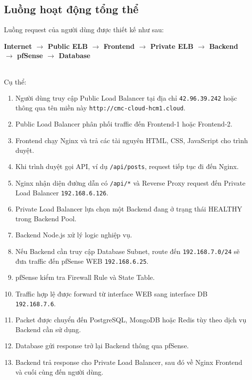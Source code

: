\documentclass[12pt, a4paper]{article}
\begin{document}
\subsection{Luồng hoạt động tổng thể}

Luồng request của người dùng được thiết kế như sau: \\

\begin{center}
\textbf{
Internet
$\rightarrow$
Public ELB
$\rightarrow$
Frontend
$\rightarrow$
Private ELB
$\rightarrow$
Backend
$\rightarrow$
pfSense
$\rightarrow$
Database
} 
\end{center} \\


\noindent Cụ thể:

\begin{enumerate}
    \item Người dùng truy cập Public Load Balancer tại địa chỉ
    \texttt{42.96.39.242} hoặc thông qua tên miền này \texttt{http://cmc-cloud-hcm1.cloud}.

    \item Public Load Balancer phân phối traffic đến
    Frontend-1 hoặc Frontend-2.

    \item Frontend chạy Nginx và trả các tài nguyên HTML, CSS,
    JavaScript cho trình duyệt.

    \item Khi trình duyệt gọi API, ví dụ
    \texttt{/api/posts}, request tiếp tục đi đến Nginx.

    \item Nginx nhận diện đường dẫn có \texttt{/api/*}
    và Reverse Proxy request đến Private Load Balancer
    \texttt{192.168.6.126}.

    \item Private Load Balancer lựa chọn một Backend đang ở trạng thái
    HEALTHY trong Backend Pool.

    \item Backend Node.js xử lý logic nghiệp vụ.

    \item Nếu Backend cần truy cập Database Subnet,
    route đến \texttt{192.168.7.0/24} sẽ đưa traffic đến
    pfSense WEB \texttt{192.168.6.25}.

    \item pfSense kiểm tra Firewall Rule và State Table.

    \item Traffic hợp lệ được forward từ interface WEB
    sang interface DB \texttt{192.168.7.6}.

    \item Packet được chuyển đến PostgreSQL, MongoDB hoặc Redis
    tùy theo dịch vụ Backend cần sử dụng.

    \item Database gửi response trở lại Backend thông qua pfSense.

    \item Backend trả response cho Private Load Balancer,
    sau đó về Nginx Frontend và cuối cùng đến người dùng.
\end{enumerate}
\end{document}
